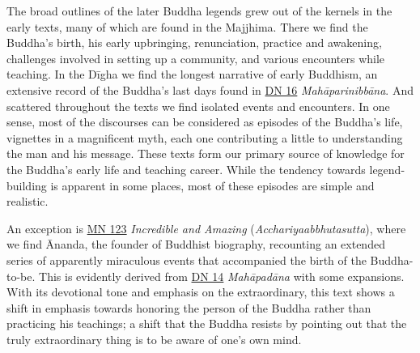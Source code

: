 \documentclass[12pt,openany]{book}%
\begin{document}
The broad outlines of the later Buddha legends grew out of the kernels in the early texts, many of which are found in the Majjhima. There we find the Buddha’s birth, his early upbringing, renunciation, practice and awakening, challenges involved in setting up a community, and various encounters while teaching. In the \textsanskrit{Dīgha} we find the longest narrative of early Buddhism, an extensive record of the Buddha’s last days found in \href{https://suttacentral.net/dn16}{DN 16} \textit{\textsanskrit{Mahāparinibbāna}}. And scattered throughout the texts we find isolated events and encounters. In one sense, most of the discourses can be considered as episodes of the Buddha’s life, vignettes in a magnificent myth, each one contributing a little to understanding the man and his message. These texts form our primary source of knowledge for the Buddha’s early life and teaching career. While the tendency towards legend-building is apparent in some places, most of these episodes are simple and realistic.

An exception is \href{https://suttacentral.net/mn123}{MN 123} \textit{Incredible and Amazing} (\textit{Acchariyaabbhutasutta}), where we find Ānanda, the founder of Buddhist biography, recounting an extended series of apparently miraculous events that accompanied the birth of the Buddha-to-be. This is evidently derived from \href{https://suttacentral.net/dn14}{DN 14} \textit{\textsanskrit{Mahāpadāna}} with some expansions. With its devotional tone and emphasis on the extraordinary, this text shows a shift in emphasis towards honoring the person of the Buddha rather than practicing his teachings; a shift that the Buddha resists by pointing out that the truly extraordinary thing is to be aware of one’s own mind.
\end{document}
